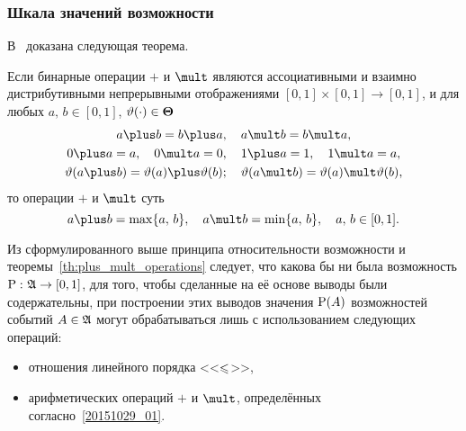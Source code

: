 \subsubsection{Шкала значений возможности}
\label{sec:sec_20151029_03}

В~\cite{possbook, possbook2} доказана следующая теорема.
\begin{theorem}
\label{th:plus_mult_operations}
Если бинарные операции $\plus$ и $\mult$ являются ассоциативными и взаимно дистрибутивными непрерывными отображениями $[0,1]\times[0,1]\to[0,1]$, и для любых $a,\, b\in[0,1]$, $\vtheta(\cdot)\in\bTheta$
\begin{gather*}
    a\plus b = b\plus a, \quad a\mult b = b\mult a,\\
    0\plus a = a, \quad 0\mult a = 0, \quad 1\plus a = 1, \quad 1\mult a = a,\\
    \vtheta(a\plus b) = \vtheta(a) \plus \vtheta(b); \quad \vtheta(a\mult b) = \vtheta(a) \mult \vtheta(b),
\end{gather*}
то операции $\plus$ и $\mult$ суть
\begin{equation}
\label{20151029_01}
    a \plus b = \max\{a,\, b\}, \quad a \mult b = \min\{a,\, b\}, \quad a,\,b \in [0,1].
\end{equation}
\end{theorem}

Из сформулированного выше принципа относительности возможности и теоремы~\ref{th:plus_mult_operations} следует, что какова бы ни была возможность ${\P:}\ {\Alg\to[0,1]}$, для того, чтобы сделанные на её основе выводы были содержательны, при построении этих выводов значения $\P(A)$ возможностей событий $A\in\Alg$ могут обрабатываться лишь с использованием следующих операций:
\begin{itemize}
\item
    отношения линейного порядка <<$\leqs$>>,
\item
    арифметических операций $\plus$ и $\mult$, определённых согласно~\eqref{20151029_01}.
\end{itemize}

